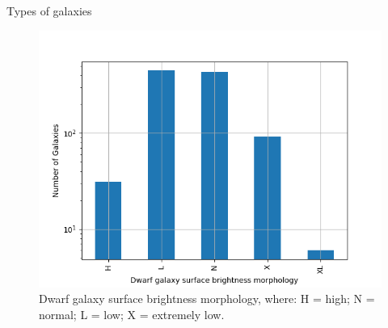 \documentclass[presentation]{beamer}
\begin{document}
\begin{frame}[label={sec:org236576b}]{Types of galaxies}
\begin{figure}[htbp]
\centering
\includegraphics[width=.9\linewidth]{./figs/hist-Tdw2.png}
\caption{\label{Types of dwarf galaxies brightness}Dwarf galaxy surface brightness morphology, where: H = high; N = normal; L = low; X = extremely low.}
\end{figure}
\end{frame}
\end{document}
